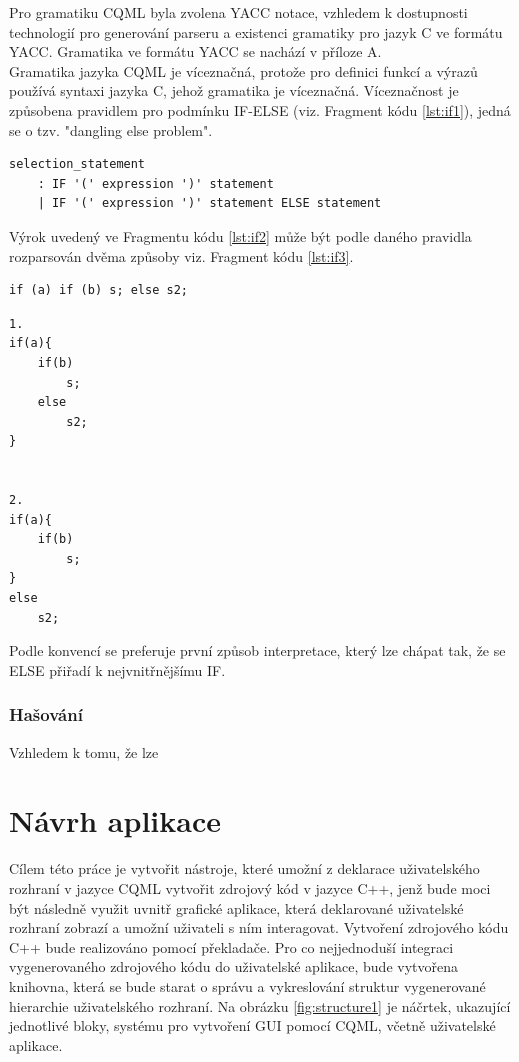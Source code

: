 \documentclass[report,11pt]{elsarticle}
\begin{document}
Pro gramatiku CQML byla zvolena YACC notace, vzhledem k dostupnosti technologií pro generování parseru a existenci gramatiky pro jazyk C ve formátu YACC. Gramatika ve formátu YACC se nachází v příloze A.\\
Gramatika jazyka CQML je víceznačná, protože pro definici funkcí a výrazů používá syntaxi jazyka C, jehož gramatika je víceznačná. Víceznačnost je způsobena pravidlem pro podmínku IF-ELSE (viz. Fragment kódu \ref{lst:if1}), jedná se o tzv. "dangling else problem".\\
\begin{lstlisting}[frame=single,caption=Víceznačné IF-ELSE pravidlo gramatiky.,label=lst:if1]
selection_statement
	: IF '(' expression ')' statement
	| IF '(' expression ')' statement ELSE statement 
\end{lstlisting}
Výrok uvedený ve Fragmentu kódu \ref{lst:if2} může být podle daného pravidla rozparsován dvěma způsoby viz. Fragment kódu \ref{lst:if3}.
\begin{lstlisting}[frame=single,caption=Příklad víceznačného výroku IF-ELSE,label=lst:if2]
if (a) if (b) s; else s2;
\end{lstlisting}

\begin{lstlisting}[frame=single,caption=Možnosti interpretace víceznačného výroku IF-ELSE,label=lst:if3]
1.
if(a){
	if(b)
		s;
	else
		s2;
}


2.
if(a){
	if(b)
		s;
}
else
	s2;
\end{lstlisting}
Podle konvencí se preferuje první způsob interpretace, který lze chápat tak, že se ELSE přiřadí k nejvnitřnějšímu IF.





\section{\label{SEC:Intro}Hašování}

Vzhledem k tomu, že lze



\part{\label{CH:aa}Návrh aplikace}
Cílem této práce je vytvořit nástroje, které umožní z deklarace uživatelského rozhraní v jazyce CQML vytvořit zdrojový kód v jazyce C++, jenž bude moci být následně využit uvnitř grafické aplikace, která deklarované uživatelské rozhraní zobrazí a umožní uživateli s ním interagovat. Vytvoření zdrojového kódu C++ bude realizováno pomocí překladače. Pro co nejjednoduší integraci vygenerovaného zdrojového kódu do uživatelské aplikace, bude vytvořena knihovna, která se bude starat o správu a vykreslování struktur vygenerované hierarchie uživatelského rozhraní. 
Na obrázku \ref{fig:structure1} je náčrtek, ukazující jednotlivé bloky, systému pro vytvoření GUI pomocí CQML, včetně uživatelské aplikace.  
\end{document}
